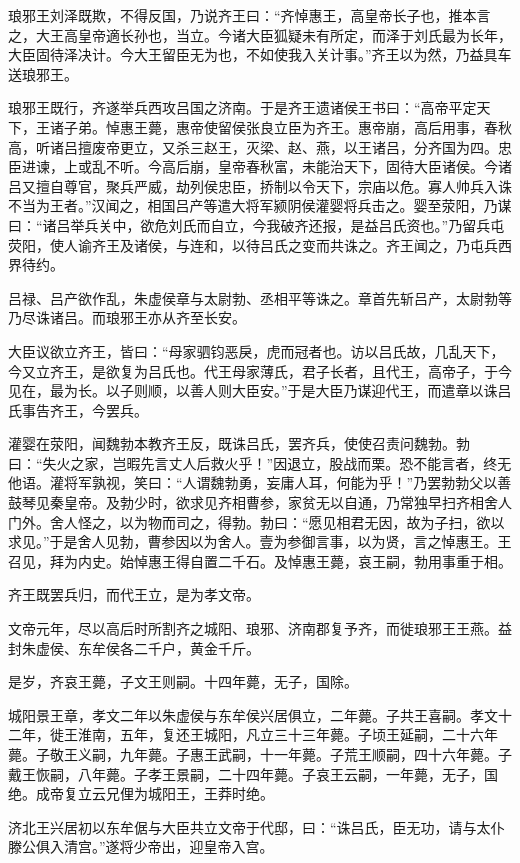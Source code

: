 \documentclass[]{article}
\begin{document}
琅邪王刘泽既欺，不得反国，乃说齐王曰：``齐悼惠王，高皇帝长子也，推本言之，大王高皇帝適长孙也，当立。今诸大臣狐疑未有所定，而泽于刘氏最为长年，大臣固待泽决计。今大王留臣无为也，不如使我入关计事。''齐王以为然，乃益具车送琅邪王。

琅邪王既行，齐遂举兵西攻吕国之济南。于是齐王遗诸侯王书曰：``高帝平定天下，王诸子弟。悼惠王薨，惠帝使留侯张良立臣为齐王。惠帝崩，高后用事，春秋高，听诸吕擅废帝更立，又杀三赵王，灭梁、赵、燕，以王诸吕，分齐国为四。忠臣进谏，上或乱不听。今高后崩，皇帝春秋富，未能治天下，固待大臣诸侯。今诸吕又擅自尊官，聚兵严威，劫列侯忠臣，挢制以令天下，宗庙以危。寡人帅兵入诛不当为王者。''汉闻之，相国吕产等遣大将军颍阴侯灌婴将兵击之。婴至荥阳，乃谋曰：``诸吕举兵关中，欲危刘氏而自立，今我破齐还报，是益吕氏资也。''乃留兵屯荧阳，使人谕齐王及诸侯，与连和，以待吕氏之变而共诛之。齐王闻之，乃屯兵西界待约。

吕禄、吕产欲作乱，朱虚侯章与太尉勃、丞相平等诛之。章首先斩吕产，太尉勃等乃尽诛诸吕。而琅邪王亦从齐至长安。

大臣议欲立齐王，皆曰：``母家驷钧恶戾，虎而冠者也。访以吕氏故，几乱天下，今又立齐王，是欲复为吕氏也。代王母家薄氏，君子长者，且代王，高帝子，于今见在，最为长。以子则顺，以善人则大臣安。''于是大臣乃谋迎代王，而遣章以诛吕氏事告齐王，今罢兵。

灌婴在荥阳，闻魏勃本教齐王反，既诛吕氏，罢齐兵，使使召责问魏勃。勃曰：``失火之家，岂暇先言丈人后救火乎！''因退立，股战而栗。恐不能言者，终无他语。灌将军孰视，笑曰：``人谓魏勃勇，妄庸人耳，何能为乎！''乃罢勃勃父以善鼓琴见秦皇帝。及勃少时，欲求见齐相曹参，家贫无以自通，乃常独早扫齐相舍人门外。舍人怪之，以为物而司之，得勃。勃曰：``愿见相君无因，故为子扫，欲以求见。''于是舍人见勃，曹参因以为舍人。壹为参御言事，以为贤，言之悼惠王。王召见，拜为内史。始悼惠王得自置二千石。及悼惠王薨，哀王嗣，勃用事重于相。

齐王既罢兵归，而代王立，是为孝文帝。

文帝元年，尽以高后时所割齐之城阳、琅邪、济南郡复予齐，而徙琅邪王王燕。益封朱虚侯、东牟侯各二千户，黄金千斤。

是岁，齐哀王薨，子文王则嗣。十四年薨，无子，国除。

城阳景王章，孝文二年以朱虚侯与东牟侯兴居俱立，二年薨。子共王喜嗣。孝文十二年，徙王淮南，五年，复还王城阳，凡立三十三年薨。子顷王延嗣，二十六年薨。子敬王义嗣，九年薨。子惠王武嗣，十一年薨。子荒王顺嗣，四十六年薨。子戴王恢嗣，八年薨。子孝王景嗣，二十四年薨。子哀王云嗣，一年薨，无子，国绝。成帝复立云兄俚为城阳王，王莽时绝。

济北王兴居初以东牟倨与大臣共立文帝于代邸，曰：``诛吕氏，臣无功，请与太仆滕公俱入清宫。''遂将少帝出，迎皇帝入宫。
\end{document}
